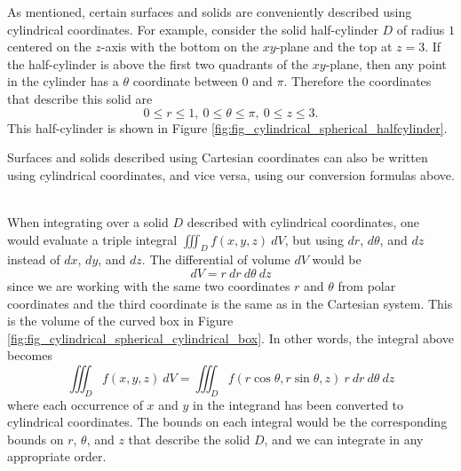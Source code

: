 As mentioned, certain surfaces and solids are conveniently described using cylindrical coordinates. For example, consider the solid half-cylinder $D$ of radius $1$ centered on the $z$-axis with the bottom on the $xy$-plane and the top at $z = 3$.  If the half-cylinder is above the first two quadrants of the $xy$-plane, then any point in the cylinder has a $\theta$ coordinate between $0$ and $\pi$.  Therefore the coordinates that describe this solid are
$$0 \leq r \leq 1, \: 0 \leq \theta \leq \pi, \: 0 \leq z \leq 3.$$
This half-cylinder is shown in Figure \ref{fig:fig_cylindrical_spherical_halfcylinder}. \\




Surfaces and solids described using Cartesian coordinates can also be written using cylindrical coordinates, and vice versa, using our conversion formulas above.\\

\\



When integrating over a solid $D$ described with cylindrical coordinates, one would evaluate a triple integral $\displaystyle\iiint_D f(x,y,z) \: dV$, but using $dr$, $d\theta$, and $dz$ instead of $dx$, $dy$, and $dz$.  The differential of volume $dV$ would be $$dV = r \: dr \: d\theta \: dz$$ since we are working with the same two coordinates $r$ and $\theta$ from polar coordinates and the third coordinate is the same as in the Cartesian system.  This is the volume of the curved box in Figure \ref{fig:fig_cylindrical_spherical_cylindrical_box}.  In other words, the integral above becomes
$$\displaystyle\iiint_D f(x,y,z) \: dV = \displaystyle\iiint_D f(r\cos\theta,r\sin\theta,z) \: r \: dr \: d\theta \: dz$$
where each occurrence of $x$ and $y$ in the integrand has been converted to cylindrical coordinates.  The bounds on each integral would be the corresponding bounds on $r$, $\theta$, and $z$ that describe the solid $D$, and we can integrate in any appropriate order.\\



